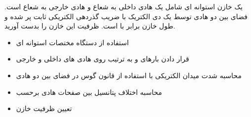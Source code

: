 \begin{ELexample}{}

یک خازن استوانه ای شامل یک هادی داخلی به شعاع  و هادی خارجی به شعاع  است. فضای بین دو هادی توسط یک دی الکتریک با ضریب گذردهی الکتریکی ثابت \ELim{\epsilon} پر شده و طول خازن برابر با  است. ظرفیت این خازن را بدست آورید.


\begin{ELsolution}

\begin{itemize}
\tightlist
\item
  استفاده از دستگاه مختصات استوانه ای
\item
  قرار دادن بارهای  و  به ترتیب روی هادی های داخلی و خارجی
\item
  محاسبه شدت میدان الکتریکی با استفاده از قانون گوس در فضای بین دو هادی
\end{itemize}


\begin{itemize}
\tightlist
\item
  محاسبه اختلاف پتانسیل بین صفحات هادی برحسب 
\end{itemize}


\begin{itemize}
\tightlist
\item
  تعیین ظرفیت خازن
\end{itemize}


\end{ELsolution}

\end{ELexample}



